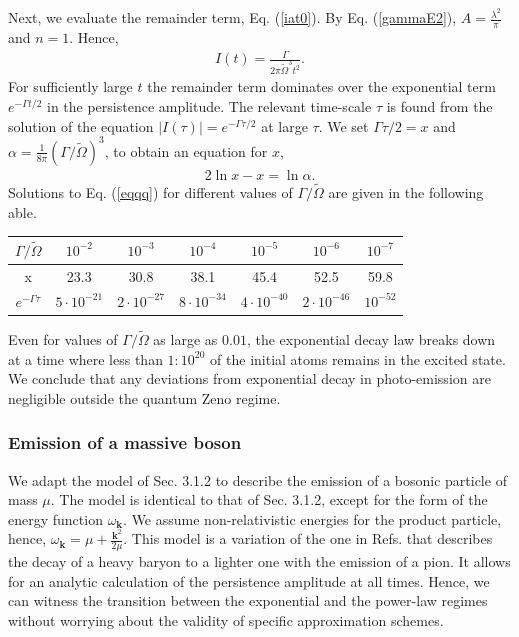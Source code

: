 \documentclass[12pt]{article}
\numberwithin{equation}{section}
\begin{document}
Next, we evaluate the remainder term, Eq. (\ref{iat0}). By Eq. (\ref{gammaE2}), $A = \frac{\lambda^2}{\pi}$ and $n = 1$. Hence,
\begin{eqnarray}
I(t) = \frac{\Gamma}{2 \pi \tilde{\Omega}^3 t^2}. \label{asyem}
\end{eqnarray}
For sufficiently large $t$ the remainder term dominates over the exponential term $e^{- \Gamma t/2}$ in the persistence amplitude. The relevant time-scale $\tau$ is found from the solution of the equation $|I(\tau) |= e^{- \Gamma \tau/2}$ at large $\tau$. We set $\Gamma \tau/ 2 =x$ and $\alpha = \frac{1}{8\pi} (\Gamma/\tilde{\Omega})^3$, to obtain an equation for $x$,
\begin{eqnarray}
2 \ln x - x =  \ln \alpha. \label{eqqq}
\end{eqnarray}
 Solutions to Eq. (\ref{eqqq}) for different values of $\Gamma/\tilde{\Omega}$ are given in the following able.

 \bigskip

 \begin{tabular}{|c||c|c|c|c|c|c|}
   \hline
   $\Gamma/\tilde{\Omega}$ & $10^{-2}$ & $10^{-3}$ & $10^{-4}$ & $10^{-5}$ & $10^{-6}$ & $10^{-7}$ \\
   \hline
   x & 23.3 & 30.8 & 38.1 & 45.4 & 52.5 & 59.8 \\
   \hline
  $ e^{-\Gamma\tau}$ & $5\cdot 10^{-21}$ & $2 \cdot 10^{-27}$ & $8 \cdot 10^{-34}$ & $4 \cdot 10^{-40}$  & $2 \cdot 10^{-46}$  &$ 10^{-52}$ \\
   \hline
 \end{tabular}

 \bigskip

Even for values of $\Gamma/\tilde{\Omega}$ as large as $0.01$,    the exponential decay law breaks down at a time where less than $1:10^{20}$ of the initial   atoms remains in the excited state. We conclude that any deviations from exponential decay in photo-emission are negligible outside the quantum Zeno regime.

\subsubsection{Emission of a massive boson}
We adapt the model of Sec. 3.1.2 to describe the emission of a   bosonic particle of mass $\mu$.  The model is identical to that of Sec. 3.1.2, except for the form of the energy function $\omega_{\pmb k}$. We assume non-relativistic energies for the product particle, hence,  $\omega_{\pmb k}= \mu + \frac{{\pmb k}^2}{2 \mu}$. This model is a variation of the one in Refs. \cite{Ghiold, AA} that describes  the decay of a heavy baryon to a lighter one   with the emission of a pion. It allows for an analytic calculation of the persistence amplitude at all times. Hence,  we can witness the transition between the exponential and the power-law regimes without worrying about the validity of specific approximation schemes.
\end{document}
